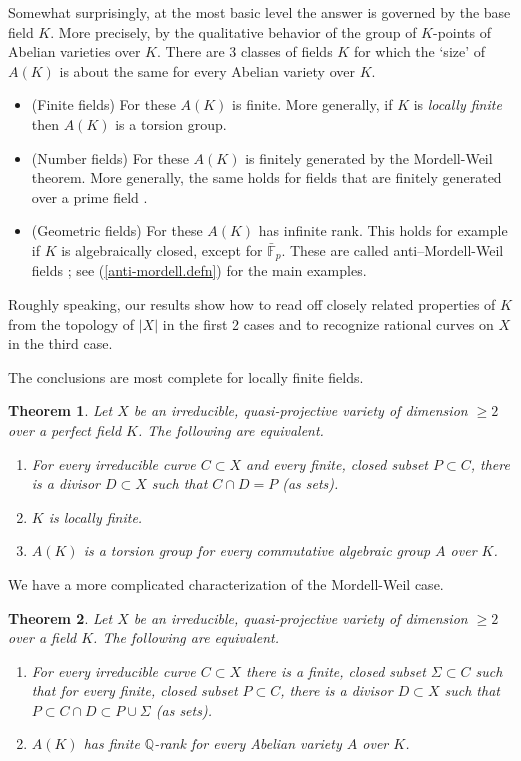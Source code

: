 \documentclass{amsart}
\newtheorem{thm}{Theorem}%
\theoremstyle{definition}
\theoremstyle{remark}
\newcommand{\f}[0]{{\mathbb F}}
\newcommand{\q}[0]{{\mathbb Q}}
\begin{document}
Somewhat surprisingly, at the most basic level  the answer is
governed by the base field $K$. More precisely, by the  qualitative behavior of the group of $K$-points  of Abelian varieties over $K$. 
 There are 3 classes of fields $K$ for which the `size' of
$A(K)$  is about the same for every Abelian variety over $K$.
\begin{itemize}
\item (Finite fields)  For these  $A(K)$ is  finite. More generally,
if $K$ is {\it locally finite}  then $A(K)$ is a torsion group.
\item (Number fields)  For these  $A(K)$ is  finitely generated by the Mordell-Weil theorem.
More generally, the same holds for fields that are finitely generated over a prime field \cite{MR0102520}.
\item (Geometric fields)  For these  $A(K)$ has  infinite rank. This holds for example if $K$ is algebraically closed, except for $\bar \f_p$.
 These  are called  anti--Mordell-Weil fields \cite{2019arXiv190204011I}; see 
(\ref{anti-mordell.defn}) for the main examples. 
\end{itemize}

Roughly speaking, our results show how to read off closely related  properties of $K$ from the topology of $|X|$ in the first 2 cases and to recognize  
rational curves on $X$ in the third case.  

The conclusions are most complete  for  locally finite fields.




\begin{thm} Let $X$ be an irreducible, quasi-projective variety of dimension $\geq 2$ over a perfect  field $K$. The following are equivalent.
\begin{enumerate}
\item For every irreducible curve $C\subset X$ and every finite, closed  subset $P\subset C$, there is a divisor $D\subset X$ such that $C\cap D=P$  (as sets).
\item $K$ is locally finite.
\item  $A(K)$ is a torsion group for every commutative algebraic group  $A$ over $K$.
\end{enumerate}
\end{thm}

We have a more complicated characterization of the Mordell-Weil case.

\begin{thm} Let $X$ be an irreducible, quasi-projective variety of dimension $\geq 2$ over a  field $K$. The following are equivalent.
\begin{enumerate}
\item For every irreducible curve $C\subset X$ there is a finite, closed subset $\Sigma\subset C$ such that for  every finite, closed subset $P\subset C$, there is a divisor $D\subset X$ such that $P\subset C\cap D\subset P\cup \Sigma$  (as sets).
\item  $A(K)$ has finite $\q$-rank   for every Abelian variety $A$ over $K$.
\end{enumerate}
\end{thm}
\end{document}
